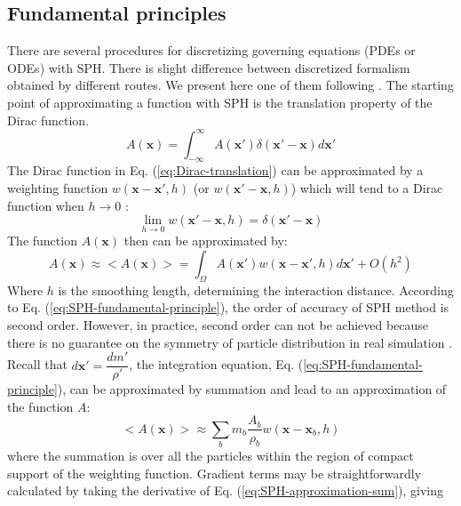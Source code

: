\documentclass[journal abbreviation, manuscript]{copernicus}
\begin{document}
\subsection{Fundamental principles}
There are several procedures for discretizing governing equations (PDEs or ODEs) with SPH. There is slight difference between discretized formalism obtained by different routes. We present here one of them following \citet{monaghan1992smoothed, monaghan2005smoothed, monaghan2012smoothed}. The starting point of approximating a function with SPH is the translation property of the Dirac function.
\begin{equation}
A(\textbf{x})=\int_{-\infty}^{\infty} A(\textbf{x} \prime) \delta (\textbf{x} \prime - \textbf{x}) d\textbf{x} \prime
\label{eq:Dirac-translation}
\end{equation}
The Dirac function in Eq. (\ref{eq:Dirac-translation}) can be approximated by a weighting function $w(\textbf{x}-\textbf{x}\prime, h)$ (or $w(\textbf{x}\prime-\textbf{x}, h)$) which will tend to a Dirac function when $h \rightarrow 0$ :
\begin{equation}
\lim _{h \rightarrow 0} w(\textbf{x} \prime-\textbf{x}, h) =  \delta (\textbf{x} \prime - \textbf{x})
\label{eq:SPH_kernel_delta}
\end{equation}
The function $A(\textbf{x})$ then can be approximated by:
\begin{equation}
A(\textbf{x}) \approx <A(\textbf{x})> = \int_{\Omega} A(\textbf{x} \prime) w(\textbf{x}-\textbf{x}\prime, h) d\textbf{x}\prime + O(h^2)
\label{eq:SPH-fundamental-principle}
\end{equation}
Where $h$ is the smoothing length, determining the interaction distance. According to Eq. (\ref{eq:SPH-fundamental-principle}), the order of accuracy of SPH method is second order. However, in practice, second order can not be achieved because there is no guarantee on the symmetry of particle distribution in real simulation \citep{price2012smoothed}.
Recall that $d\textbf{x}\prime = \dfrac{dm \prime}{\rho \prime}$, the integration equation, Eq. (\ref{eq:SPH-fundamental-principle}), can be approximated by summation and lead to an approximation of the function $A$:
\begin{equation}
<A(\textbf{x})> \approx \sum_b m_b \dfrac{A_b}{\rho_b} w(\textbf{x}-\textbf{x}_b, h)
\label{eq:SPH-approximation-sum}
\end{equation}
where the summation is over all the particles within the region of compact support of the weighting function. 
Gradient terms may be straightforwardly calculated by taking the derivative of Eq. (\ref{eq:SPH-approximation-sum}), giving
\end{document}
